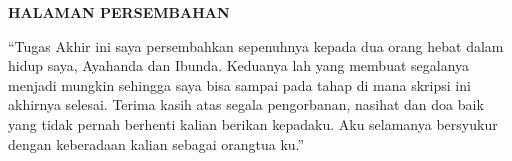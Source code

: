 
\clearpage
{}
{}
\begin{center}
    \textbf{\large HALAMAN PERSEMBAHAN}\\[3em]
\end{center}


\begin{center}
    “Tugas Akhir ini saya persembahkan sepenuhnya kepada dua orang hebat dalam hidup saya, Ayahanda dan Ibunda. Keduanya lah yang membuat segalanya menjadi mungkin sehingga saya bisa sampai pada tahap di mana skripsi ini akhirnya selesai. Terima kasih atas segala pengorbanan, nasihat dan doa baik yang tidak pernah berhenti kalian berikan kepadaku. Aku selamanya bersyukur dengan keberadaan kalian sebagai orangtua ku.”
\end{center}

